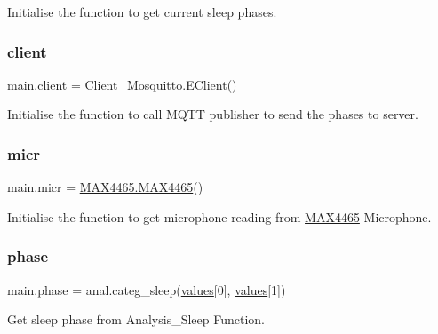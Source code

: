 Initialise the function to get current sleep phases. 

\mbox{\label{namespacemain_aad009058dac8198809f98fe83cc37d3a}} 
\subsubsection{\texorpdfstring{client}{client}}
{\footnotesize\ttfamily main.\+client = \mbox{\hyperlink{class_client___mosquitto_1_1_e_client}{Client\+\_\+\+Mosquitto.\+E\+Client}}()}



Initialise the function to call M\+Q\+TT publisher to send the phases to server. 

\mbox{\label{namespacemain_a27768b36047205d2d3b08804bef89ec8}} 
\subsubsection{\texorpdfstring{micr}{micr}}
{\footnotesize\ttfamily main.\+micr = \mbox{\hyperlink{class_m_a_x4465_1_1_m_a_x4465}{M\+A\+X4465.\+M\+A\+X4465}}()}



Initialise the function to get microphone reading from \mbox{\hyperlink{namespace_m_a_x4465}{M\+A\+X4465}} Microphone. 

\mbox{\label{namespacemain_a820766bc10bffa4259a49bb6c4166b35}} 
\subsubsection{\texorpdfstring{phase}{phase}}
{\footnotesize\ttfamily main.\+phase = anal.\+categ\+\_\+sleep(\mbox{\hyperlink{namespacemain_a17b0e348aeb04d6902b433a3436c48d1}{values}}\mbox{[}0\mbox{]}, \mbox{\hyperlink{namespacemain_a17b0e348aeb04d6902b433a3436c48d1}{values}}\mbox{[}1\mbox{]})}



Get sleep phase from Analysis\+\_\+\+Sleep Function. 

\mbox{\label{namespacemain_ab3b0ae85668b1ae6099cf9bfd36077f0}} 
